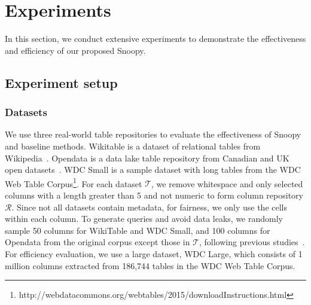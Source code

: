 \section{Experiments}
\label{sec:exp}

In this section, we conduct extensive experiments to demonstrate the effectiveness and efficiency of our proposed \textsf{Snoopy}.

\subsection{Experiment setup}
\subsubsection{Datasets}

We use three real-world table repositories to evaluate the effectiveness of \textsf{Snoopy} and baseline methods. 
Wikitable is a dataset of relational tables from Wikipedia~\cite{Wikidataset}. Opendata is a data lake table repository from Canadian and UK open datasets~\cite{LSH,santos}. WDC Small is a sample dataset with long tables from the WDC Web Table Corpus\footnote{http://webdatacommons.org/webtables/2015/downloadInstructions.html}. For each dataset $\mathcal{T}$, we remove whitespace and only selected columns with a length greater than 5 and not numeric to form column repository $\mathcal{R}$. Since not all datasets contain metadata, for fairness, we only use the cells within each column. To generate queries and avoid data leaks, we randomly sample 50 columns for WikiTable and WDC Small, and 100 columns for Opendata from the original corpus except those in $\mathcal{T}$, following previous studies~\cite{Deepjoin, starmine}. 
For efficiency evaluation, we use a large dataset, WDC Large, which consists of 1 million columns extracted from 186,744 tables in the WDC Web Table Corpus.




